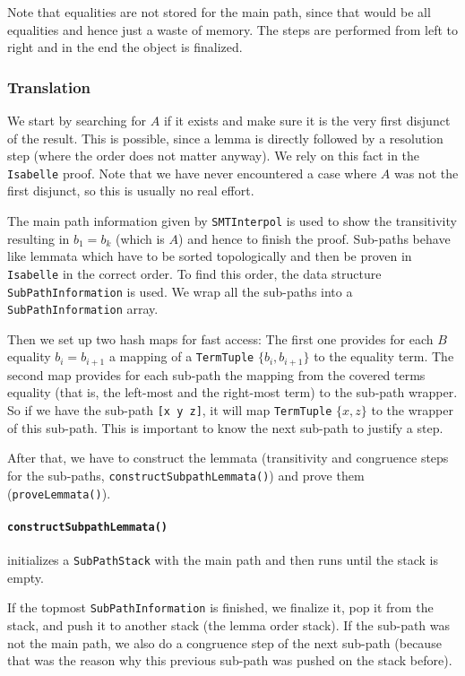 \documentclass[10pt,a4paper]{article}
\newcommand{\si}{\texttt{SMTInterpol}\xspace}
\newcommand{\isa}{\texttt{Isabelle}\xspace}
\newcommand{\ttt}{\texttt}
\begin{document}
Note that equalities are not stored for the main path, since that would be all equalities and hence just a waste of memory. The steps are performed from left to right and in the end the object is finalized.
%
\subsubsection*{Translation}
We start by searching for $A$ if it exists and make sure it is the very first disjunct of the result. This is possible, since a lemma is directly followed by a resolution step (where the order does not matter anyway). We rely on this fact in the \isa proof. Note that we have never encountered a case where $A$ was not the first disjunct, so this is usually no real effort.

The main path information given by \si is used to show the transitivity resulting in $b_1 = b_k$ (which is $A$) and hence to finish the proof. Sub-paths behave like lemmata which have to be sorted topologically and then be proven in \isa in the correct order. To find this order, the data structure \ttt{SubPathInformation} is used. We wrap all the sub-paths into a \ttt{SubPathInformation} array.

Then we set up two hash maps for fast access: The first one provides for each $B$ equality $b_i = b_{i+1}$ a mapping of a \ttt{TermTuple} $\{b_i, b_{i+1}\}$ to the equality term. The second map provides for each sub-path the mapping from the covered terms equality (that is, the left-most and the right-most term) to the sub-path wrapper. So if we have the sub-path \ttt{[x y z]}, it will map \ttt{TermTuple} $\{x, z\}$ to the wrapper of this sub-path. This is important to know the next sub-path to justify a step.

After that, we have to construct the lemmata (transitivity and congruence steps for the sub-paths, \ttt{constructSubpathLemmata()}) and prove them (\ttt{proveLemmata()}).
%
\paragraph*{\ttt{constructSubpathLemmata()}} initializes a \ttt{SubPathStack} with the main path and then runs until the stack is empty.

If the topmost \ttt{SubPathInformation} is finished, we finalize it, pop it from the stack, and push it to another stack (the lemma order stack). If the sub-path was not the main path, we also do a congruence step of the next sub-path (because that was the reason why this previous sub-path was pushed on the stack before).
\end{document}

